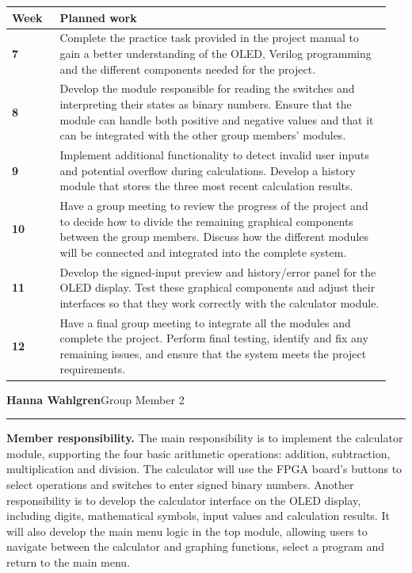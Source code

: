 \documentclass[10pt,a4paper]{article}
\makeatletter
\newcommand{\member}[2]{%
  \vspace{2pt}%
  {\bfseries\large #1}\hfill{\small #2}\par
  \vspace{1pt}\hrule\vspace{3pt}%
}
\newcommand{\role}{\textbf{Member responsibility.} }
\newenvironment{timeline}{%
  \vspace{2pt}%
  \begin{tabular}{@{}>{\bfseries}p{0.12\linewidth}p{0.83\linewidth}@{}}%
  \hline
  Week & \textbf{Planned work}\\
  \hline
}{%
  \hline
  \end{tabular}%
  \vspace{2pt}%
}
\newcommand{\wk}[2]{#1 & #2\\}
\makeatother
\begin{document}
\begin{timeline}
\wk{7}{Complete the practice task provided in the project manual to gain a
better understanding of the OLED, Verilog programming and the different
components needed for the project.}

\wk{8}{Develop the module responsible for reading the switches and interpreting
their states as binary numbers. Ensure that the module can handle both positive
and negative values and that it can be integrated with the other group members'
modules.}

\wk{9}{Implement additional functionality to detect invalid user inputs and
potential overflow during calculations. Develop a history module that stores
the three most recent calculation results.}

\wk{10}{Have a group meeting to review the progress of the project and to decide
how to divide the remaining graphical components between the group members.
Discuss how the different modules will be connected and integrated into the
complete system.}

\wk{11}{Develop the signed-input preview and history/error panel for the OLED
display. Test these graphical components and adjust their interfaces so that
they work correctly with the calculator module.}

\wk{12}{Have a final group meeting to integrate all the modules and complete the
project. Perform final testing, identify and fix any remaining issues, and
ensure that the system meets the project requirements.}
\end{timeline}

\member{Hanna Wahlgren}{Group Member 2}
\role
The main responsibility is to implement the calculator module,
supporting the four basic arithmetic operations: addition, subtraction,
multiplication and division. The calculator will use the FPGA board's buttons
to select operations and switches to enter signed binary numbers. Another
responsibility is to develop the calculator interface on the OLED display,
including digits, mathematical symbols, input values and calculation results.
It will also develop the main menu logic in
the top module, allowing users to navigate between the calculator and graphing
functions, select a program and return to the main menu.
\end{document}
